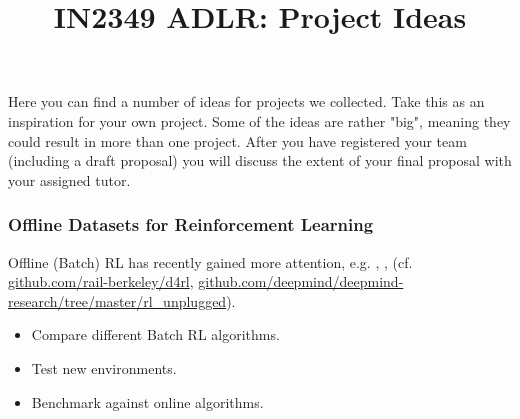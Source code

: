 \documentclass[a4paper]{article}
\title{IN2349 ADLR: Project Ideas}
\author{}
\begin{document}
\maketitle

Here you can find a number of ideas for projects we collected.
Take this as an inspiration for your own project.
Some of the ideas are rather "big", meaning they could result in more than one project.
After you have registered your team (including a draft proposal) you will discuss the extent of your final proposal with your assigned tutor.



\subsubsection{Offline Datasets for Reinforcement Learning}
Offline (Batch) RL has recently gained more attention, e.g. \cite{Agarwal2019}, \cite{nair2020}, \cite{AWOpt2021} (cf. \url{github.com/rail-berkeley/d4rl}, \url{github.com/deepmind/deepmind-research/tree/master/rl_unplugged}).
\begin{itemize}
  \item Compare different Batch RL algorithms.
  \item Test new environments.
  \item Benchmark against online algorithms.
\end{itemize}
\end{document}
